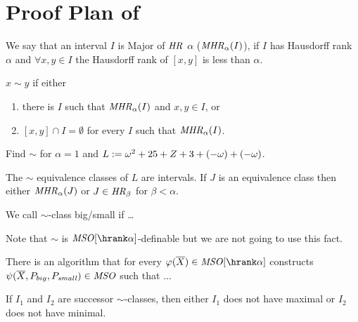 \section{Proof Plan of }
We say that an interval $I$ is  Major  of $\mathit{HR}$ $\alpha$ ($\mathit{MHR}_\alpha(I)$), if $I$ has Hausdorff  rank $\alpha$ and $\forall x,y\in I$ the Hausdorff  rank of $[x,y]$ is less than $\alpha$. 
%
\begin{dfn}
  $x\sim y$ if either
  \begin{enumerate}
    \item there is $I$  such that $\mathit{MHR}_\alpha(I)$  and  $x,y\in I$, or 
    \item $[x,y]\cap I=\emptyset$
for every $I$  such that $\mathit{MHR}_\alpha(I)$. 
  \end{enumerate}
\end{dfn}
\begin{examp}
  Find $\sim$ for $\alpha=1$ and $L:=\omega^2 +25 +Z +3 +(-\omega)+(-\omega)$.
\end{examp}
\begin{lemma} The $\sim$ equivalence classes of $L$  are intervals. If $J$ is an equivalence class %
 then
either $\mathit{MHR}_\alpha(J)$ or $J\in \mathit{HR}_\beta$ for $\beta<\alpha$.
  
\end{lemma}
We call $\sim$-class big/small if \dots

Note that $\sim$ is $\MSO[\hrank\alpha]$-definable but we are not going to use this fact.
 \begin{lemma}[Translation]\label{lem:translation} There is an algorithm that 
 for every $\vp (\vX)\in \MSO[\hrank\alpha]$ constructs  $\psi(\overline{X}, P_{big},P_{\mathit{small}})\in \mathit{MSO}$ %
 such that $\dots$
    
 \end{lemma}
 
 
 If $I_1$ and $I_2$ are successor $\sim$-classes,
 then either $I_1$ does not have maximal or $I_2$ does not have minimal.
 
